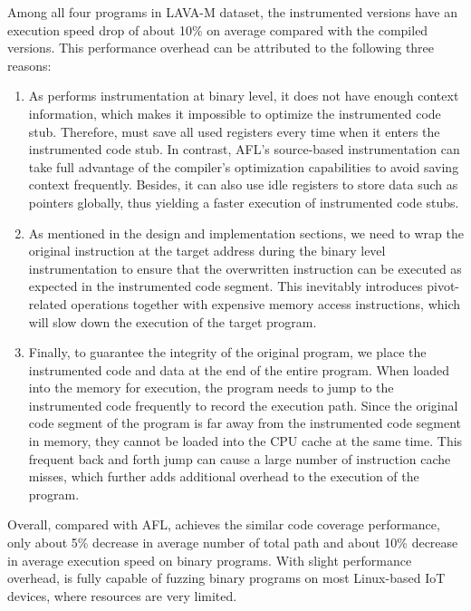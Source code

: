 Among all four programs in LAVA-M dataset, the instrumented versions have an execution speed drop of about 10\% on average compared with the compiled versions. This performance overhead can be attributed to the following three reasons:

\begin{enumerate}
    \item As \sysname performs instrumentation at binary level, it does not have enough context information, which makes it impossible to optimize the instrumented code stub. Therefore, \sysname must save all used registers every time when it enters the instrumented code stub. In contrast, AFL's source-based instrumentation can take full advantage of the compiler's optimization capabilities to avoid saving context frequently. Besides, it can also use idle registers to store data such as pointers globally, thus yielding a faster execution of instrumented code stubs.
    
    \item As mentioned in the design and implementation sections, we need to wrap the original instruction at the target address during the binary level instrumentation to ensure that the overwritten instruction can be executed as expected in the instrumented code segment. This inevitably introduces pivot-related operations together with expensive memory access instructions, which will slow down the execution of the target program.
    
    \item Finally, to guarantee the integrity of the original program, we place the instrumented code and data at the end of the entire program. 
    When loaded into the memory for execution, the program needs to jump to the instrumented code frequently to record the execution path. Since the original code segment of the program is far away from the instrumented code segment in memory, they cannot be loaded into the CPU cache at the same time. This frequent back and forth jump can cause a large number of instruction cache misses, which further adds additional overhead to the execution of the program.
\end{enumerate}

Overall, compared with AFL, \sysname achieves the similar code coverage performance, only about 5\% decrease in average number of total path and about 10\% decrease in average execution speed on binary programs. With slight performance overhead, \sysname is fully capable of fuzzing binary programs on most Linux-based IoT devices, where resources are very limited.

